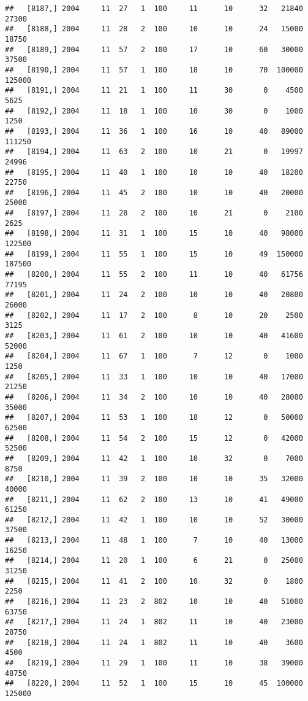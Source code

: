 \documentclass{article}\usepackage[]{graphicx}\usepackage[]{color}
\makeatletter
\newenvironment{kframe}{%
 \def\at@end@of@kframe{}%
 \ifinner\ifhmode%
  \def\at@end@of@kframe{\end{minipage}}%
  \begin{minipage}{\columnwidth}%
 \fi\fi%
 \def\FrameCommand##1{\hskip\@totalleftmargin \hskip-\fboxsep
 \colorbox{shadecolor}{##1}\hskip-\fboxsep
     \hskip-\linewidth \hskip-\@totalleftmargin \hskip\columnwidth}%
 \MakeFramed {\advance\hsize-\width
   \@totalleftmargin\z@ \linewidth\hsize
   \@setminipage}}%
 {\par\unskip\endMakeFramed%
 \at@end@of@kframe}
\newenvironment{knitrout}{}{} %
\makeatother
\begin{document}
\begin{knitrout}
\begin{kframe}
\begin{verbatim}
##   [8187,] 2004     11  27   1  100     11      10      32   21840   27300
##   [8188,] 2004     11  28   2  100     10      10      24   15000   18750
##   [8189,] 2004     11  57   2  100     17      10      60   30000   37500
##   [8190,] 2004     11  57   1  100     18      10      70  100000  125000
##   [8191,] 2004     11  21   1  100     11      30       0    4500    5625
##   [8192,] 2004     11  18   1  100     10      30       0    1000    1250
##   [8193,] 2004     11  36   1  100     16      10      40   89000  111250
##   [8194,] 2004     11  63   2  100     10      21       0   19997   24996
##   [8195,] 2004     11  40   1  100     10      10      40   18200   22750
##   [8196,] 2004     11  45   2  100     10      10      40   20000   25000
##   [8197,] 2004     11  28   2  100     10      21       0    2100    2625
##   [8198,] 2004     11  31   1  100     15      10      40   98000  122500
##   [8199,] 2004     11  55   1  100     15      10      49  150000  187500
##   [8200,] 2004     11  55   2  100     11      10      40   61756   77195
##   [8201,] 2004     11  24   2  100     10      10      40   20800   26000
##   [8202,] 2004     11  17   2  100      8      10      20    2500    3125
##   [8203,] 2004     11  61   2  100     10      10      40   41600   52000
##   [8204,] 2004     11  67   1  100      7      12       0    1000    1250
##   [8205,] 2004     11  33   1  100     10      10      40   17000   21250
##   [8206,] 2004     11  34   2  100     10      10      40   28000   35000
##   [8207,] 2004     11  53   1  100     18      12       0   50000   62500
##   [8208,] 2004     11  54   2  100     15      12       0   42000   52500
##   [8209,] 2004     11  42   1  100     10      32       0    7000    8750
##   [8210,] 2004     11  39   2  100     10      10      35   32000   40000
##   [8211,] 2004     11  62   2  100     13      10      41   49000   61250
##   [8212,] 2004     11  42   1  100     10      10      52   30000   37500
##   [8213,] 2004     11  48   1  100      7      10      40   13000   16250
##   [8214,] 2004     11  20   1  100      6      21       0   25000   31250
##   [8215,] 2004     11  41   2  100     10      32       0    1800    2250
##   [8216,] 2004     11  23   2  802     10      10      40   51000   63750
##   [8217,] 2004     11  24   1  802     11      10      40   23000   28750
##   [8218,] 2004     11  24   1  802     11      10      40    3600    4500
##   [8219,] 2004     11  29   1  100     11      10      38   39000   48750
##   [8220,] 2004     11  52   1  100     15      10      45  100000  125000

\end{verbatim}
\end{kframe}
\end{knitrout}
\end{document}
